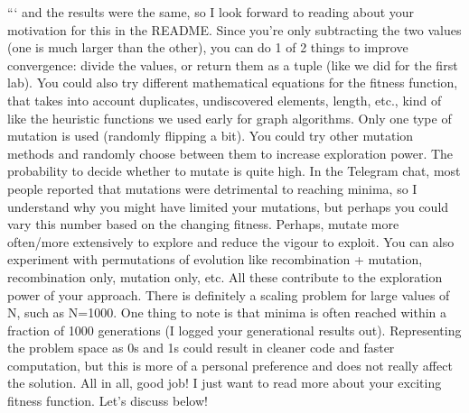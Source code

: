 {} ``` and the results were the same, so I look forward to reading about your motivation for this in the README. Since you're only subtracting the two values (one is much larger than the other), you can do 1 of 2 things to improve convergence: divide the values, or return them as a tuple (like we did for the first lab). You could also try different mathematical equations for the fitness function, that takes into account duplicates, undiscovered elements, length, etc., kind of like the heuristic functions we used early for graph algorithms.\markdownRendererInterblockSeparator
{}\markdownRendererOlBegin
{}Only one type of mutation is used (randomly flipping a bit). You could try other mutation methods and randomly choose between them to increase exploration power.\markdownRendererOlItemEnd 
{}The probability to decide whether to mutate is quite high. In the Telegram chat, most people reported that mutations were detrimental to reaching minima, so I understand why you might have limited your mutations, but perhaps you could vary this number based on the changing fitness. Perhaps, mutate more often/more extensively to explore and reduce the vigour to exploit. You can also experiment with permutations of evolution like recombination + mutation, recombination only, mutation only, etc. All these contribute to the exploration power of your approach.\markdownRendererOlItemEnd 
{}There is definitely a scaling problem for large values of N, such as \markdownRendererDollarSign{}N=1000\markdownRendererDollarSign{}. One thing to note is that minima is often reached within a fraction of 1000 generations (I logged your generational results out).\markdownRendererOlItemEnd 
{}Representing the problem space as 0s and 1s could result in cleaner code and faster computation, but this is more of a personal preference and does not really affect the solution.\markdownRendererOlItemEnd 
\markdownRendererOlEnd \markdownRendererInterblockSeparator
{}All in all, good job! I just want to read more about your exciting fitness function. Let's discuss below!\relax